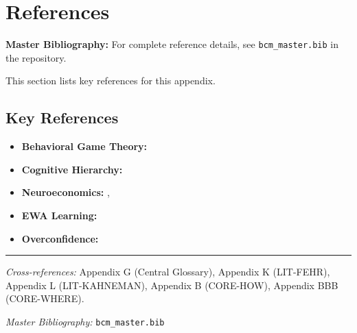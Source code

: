 \section{References}
\label{sec:ca-references}

\begin{tcolorbox}[colback=blue!5!white, colframe=blue!75!black]
\textbf{Master Bibliography:} For complete reference details, see
\texttt{bcm\_master.bib} in the repository.

This section lists key references for this appendix.
\end{tcolorbox}

\vspace{0.5em}

\subsection{Key References}

\begin{itemize}[nosep]
    \item \textbf{Behavioral Game Theory:} \citet{PAP-PAP-camerer2003behavioralbehavioral}
    \item \textbf{Cognitive Hierarchy:} \citet{PAP-PAP-camerer2004neuroeconomicscognitive}
    \item \textbf{Neuroeconomics:} \citet{PAP-PAP-camerer2004neuroeconomicsneuroeconomics}, \citet{fehr2007neurobiology}
    \item \textbf{EWA Learning:} \citet{PAP-camerer2005frame}
    \item \textbf{Overconfidence:} \citet{PAP-camerer1999overconfidence}
\end{itemize}

\nocite{bcm_master}



\vspace{1em}
\hrule
\vspace{0.5em}

\noindent\textit{Cross-references:}
Appendix G (Central Glossary),
Appendix K (LIT-FEHR),
Appendix L (LIT-KAHNEMAN),
Appendix B (CORE-HOW),
Appendix BBB (CORE-WHERE).

\noindent\textit{Master Bibliography:} \texttt{bcm\_master.bib}


